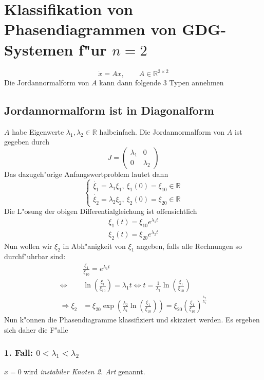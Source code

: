 \documentclass[a4paper, 13pt]{scrreprt}
\theoremstyle{definition} \newtheorem{definition}{Definition}[section]
\newcommand{\RR}{\mathbb{R}}
\begin{document}
\section{Klassifikation von Phasendiagrammen von GDG-Systemen f"ur $n=2$}
	\[\dot{x} = Ax, \qquad A \in \RR^{2\times 2} \]
Die Jordannormalform von $A$ kann dann folgende $3$ Typen annehmen
\subsection{Jordannormalform ist in Diagonalform}
\(A\) habe Eigenwerte \(\lambda_1, \lambda_2 \in \RR\) halbeinfach. Die Jordannormalform von $A$ ist gegeben durch $$J = \left(\begin{array}{cc} \lambda_1 & 0 \\ 0 & \lambda_2 \end{array} \right) $$ Das dazugeh"orige Anfangswertproblem lautet dann 
			\[ \begin{cases} \dot{\xi_1} = \lambda_1 \xi_1 , \ \xi_1(0) = \xi_{10}\in\RR \\
				\dot{\xi_2} = \lambda_2 \xi_2 , \ \xi_2(0) = \xi_{20}\in \RR \end {cases} 
			\]
Die L"osung der obigen Differentialgleichung ist offensichtlich 
			\begin{align*}
						\xi_1(t)   = \xi_{10} e^{\lambda_1 t} \\
						\xi_2(t)   = \xi_{20} e^{\lambda_2 t} 
			\end{align*}
Nun wollen wir $\xi_2$ in Abh"anigkeit von $\xi_1$ angeben, falls alle Rechnungen so durchf"uhrbar sind:
					\begin{align*}
						&\frac{\xi_1}{\xi_{10}} = e^{\lambda_1t} \\
						\Leftrightarrow &\ln{\left(\frac{\xi_1}{\xi_{10}}\right)} = \lambda_1 t 		
						\Leftrightarrow t = 	
						\frac {1}{\lambda_1} \ln \left(\frac{\xi_1}{\xi_{10}} \right) \\
						\Rightarrow \xi_2 &  = \xi_{20} \exp\left( \frac{\lambda_2}{\lambda_1} \ln\left(	\frac{\xi_1}{\xi_{10}} \right) \right) = \xi_{20} \left(\frac{\xi_1}{\xi_{10}}\right)^{\frac{\lambda_2}{\lambda_1}}  					
				\end{align*}
Nun k"onnen die Phasendiagramme klassifiziert und skizziert werden. Es ergeben sich daher die F"alle
\subsubsection{1. Fall: \(0<\lambda_1 < \lambda_2\) }
	\( x = 0 \) wird \emph{instabiler Knoten 2. Art} genannt.
\end{document}
